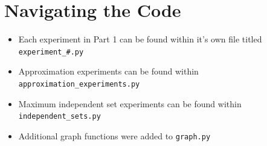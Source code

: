 \documentclass[titlepage]{article}
\begin{document}
\appendix
\section{Navigating the Code}

\begin{itemize}
    \item Each experiment in Part 1 can be found within it's own file titled \verb|experiment_#.py|
    \item Approximation experiments can be found within \verb|approximation_experiments.py|
    \item Maximum independent set experiments can be found within \verb|independent_sets.py|
    \item Additional graph functions were added to \verb|graph.py|
\end{itemize}
\end{document}
